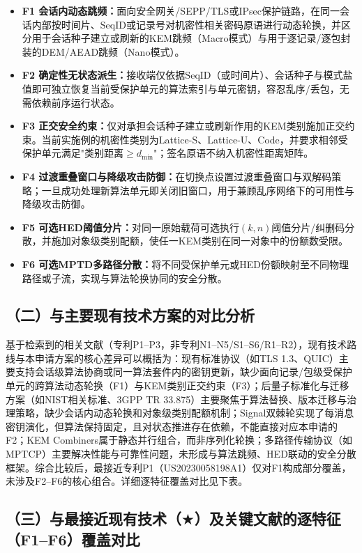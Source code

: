 ﻿\documentclass[12pt,a4paper]{article}
\newcommand{\SeqID}{\mathrm{SeqID}}
\begin{document}
\begin{itemize}[leftmargin=2em]
    \item \textbf{F1 会话内动态跳频：}面向安全网关/SEPP/TLS或IPsec保护链路，在同一会话内部按时间片、$\SeqID$或记录号对机密性相关密码原语进行动态轮换，并区分用于会话种子建立或刷新的KEM跳频（Macro模式）与用于逐记录/逐包封装的DEM/AEAD跳频（Nano模式）。
    \item \textbf{F2 确定性无状态派生：}接收端仅依据$\SeqID$（或时间片）、会话种子与模式盐值即可独立恢复当前受保护单元的算法索引与单元密钥，容忍乱序/丢包，无需依赖前序运行状态。
    \item \textbf{F3 正交安全约束：}仅对承担会话种子建立或刷新作用的KEM类别施加正交约束。当前实施例的机密性类别为Lattice-S、Lattice-U、Code，并要求相邻受保护单元满足"类别距离$\ge d_{\min}$"；签名原语不纳入机密性距离矩阵。
    \item \textbf{F4 过渡重叠窗口与降级攻击防御：}在切换点设置过渡重叠窗口与双解码策略；一旦成功处理新算法单元即关闭旧窗口，用于兼顾乱序网络下的可用性与降级攻击防御。
    \item \textbf{F5 可选HED阈值分片：}对同一原始载荷可选执行$(k,n)$阈值分片/纠删码分散，并施加对象级类别配额，使任一KEM类别在同一对象中的份额数受限。
    \item \textbf{F6 可选MPTD多路径分散：}将不同受保护单元或HED份额映射至不同物理路径或子流，实现与算法轮换协同的安全分散。
\end{itemize}

\subsection*{（二）与主要现有技术方案的对比分析}

基于检索到的相关文献（专利P1--P3，非专利N1--N5/S1--S6/R1--R2），现有技术路线与本申请方案的核心差异可以概括为：现有标准协议（如TLS 1.3、QUIC）主要支持会话级算法协商或同一算法套件内的密钥更新，缺少面向记录/包级受保护单元的跨算法动态轮换（F1）与KEM类别正交约束（F3）；后量子标准化与迁移方案（如NIST相关标准、3GPP TR 33.875）主要聚焦于算法替换、版本迁移与治理策略，缺少会话内动态轮换和对象级类别配额机制；Signal双棘轮实现了每消息密钥演化，但算法保持固定，且对状态推进存在依赖，不能直接对应本申请的F2；KEM Combiners属于静态并行组合，而非序列化轮换；多路径传输协议（如MPTCP）主要解决性能与可靠性问题，未形成与算法跳频、HED联动的安全分散框架。综合比较后，最接近专利P1（US20230058198A1）仅对F1构成部分覆盖，未涉及F2--F6的核心组合。详细逐特征覆盖对比见下表。

\subsection*{（三）与最接近现有技术（$\bigstar$）及关键文献的逐特征（F1--F6）覆盖对比}
\end{document}
